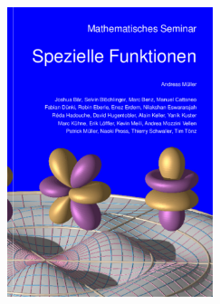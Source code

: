 \documentclass[aspectratio=169]{beamer}
\begin{document}
\begin{frame}
\begin{columns}
\begin{column}{0.48\textwidth}
\titlepage
\end{column}
\begin{column}{0.48\textwidth}
\begin{center}
\includegraphics[width=6cm]{cover.jpg}
\end{center}
\end{column}
\end{columns}
\end{frame}

\end{document}

